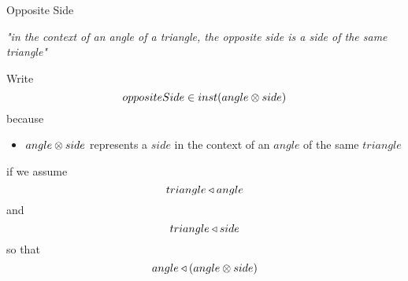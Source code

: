 \begin{frame}{Opposite Side}
\iffalse
{\begin{displaymath}
\begin{array}{c p{0.5cm} c  c} 
                &&\rnode{Bp}{} &                   \\
\rnode{A}{}&                   &                   \\[0.25cm]
                &&             & \rnode{Cp}{} \\
\end{array}
\ncline[nodesep=0pt]{A}{Bp}
\ncput{\rnode{B}{}}
\ncline[nodesep=0pt]{A}{Cp}
\ncput{\rnode{C}{}}
\ncline[nodesep=0pt]{Bp}{Cp}
\ncline[nodesep=0pt]{B}{C}
\nput[labelsep=1pt]{180}{A}{A}
\nput[labelsep=2pt]{80}{Bp}{B'}
\nput[labelsep=1pt]{290}{Cp}{C'}
\nput[labelsep=1pt]{120}{B}{B}
\nput[labelsep=2pt]{260}{C}{C}
\end{displaymath}
}
\fi

\textit{"in the context of an angle of a triangle, the opposite side is a side of the same triangle"}

\medskip
Write 
$$oppositeSide \in inst(angle \otimes side)$$
because
\begin{itemize}
\item $angle \otimes side$ represents a $side$ in the context of an $angle$ of the same $triangle$
\end{itemize}
if we assume
$$triangle \triangleleft angle$$
 and 
$$triangle \triangleleft side$$
so that
$$angle \triangleleft (angle \otimes side)$$
\end{frame}
